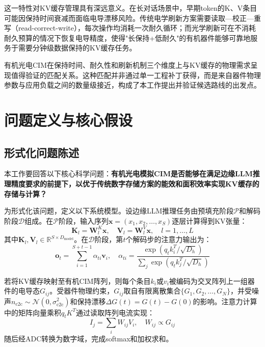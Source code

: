 这一特性对KV缓存管理具有深远意义。在长对话场景中，早期token的K、V条目可能因保持时间衰减而面临电导漂移风险。传统电学刷新方案需要读取—校正—重写（read-correct-write），每次操作均消耗一次耐久循环；而光学刷新可在不消耗耐久预算的情况下恢复电导精度，使得"长保持+低耐久"的有机器件能够可靠地服务于需要分钟级数据保持的KV缓存任务。

有机光电CIM在保持时间、耐久性和刷新机制三个维度上与KV缓存的物理需求呈现值得验证的匹配关系。这种匹配并非通过单一工程补丁获得，而是来自器件物理参数与应用负载之间的数量级接近，构成了本工作提出并验证候选路线的出发点。


\section{问题定义与核心假设}
\label{sec:work2_problem}

\subsection{形式化问题陈述}

本工作要回答以下核心科学问题：\textbf{有机光电模拟CIM是否能够在满足边缘LLM推理精度要求的前提下，以优于传统数字存储方案的能效和面积效率实现KV缓存的存储与计算？}

为形式化该问题，定义以下系统模型。设边缘LLM推理任务由预填充阶段$\mathcal{P}$和解码阶段$\mathcal{D}$组成。在$\mathcal{P}$阶段，输入序列$\mathbf{x} = (x_1, x_2, \dots, x_S)$逐层计算得到KV张量：
\begin{equation}
\mathbf{K}_l = \mathbf{W}_l^K \mathbf{x}, \quad \mathbf{V}_l = \mathbf{W}_l^V \mathbf{x}, \quad l = 1, \dots, L
\label{eq:kv_compute}
\end{equation}
其中$\mathbf{K}_l, \mathbf{V}_l \in \mathbb{R}^{S \times D_{\text{model}}}$。在$\mathcal{D}$阶段，第$t$个解码步的注意力输出为：
\begin{equation}
\mathbf{o}_t = \sum_{i=1}^{S+t-1} \alpha_{ti} \mathbf{v}_i, \quad \alpha_{ti} = \frac{\exp(q_t k_i^T / \sqrt{D_h})}{\sum_j \exp(q_t k_j^T / \sqrt{D_h})}
\label{eq:attention_detail}
\end{equation}

若将KV缓存映射至有机CIM阵列，则每个条目$k_i$或$v_i$被编码为交叉阵列上一组器件的电导态$G_{ij}$。受器件物理约束，$G_{ij}$取自有限离散集合$\{G_1, G_2, \dots, G_N\}$，并受噪声$n_{\text{c2c}} \sim \mathcal{N}(0, \sigma_{\text{c2c}}^2)$和保持漂移$\Delta G(t) = G(t) - G(0)$的影响。注意力计算中的矩阵向量乘积$q_t K^T$通过读取阵列电流实现：
\begin{equation}
I_j = \sum_i W_{ij} V_i, \quad W_{ij} \propto G_{ij}
\label{eq:crossbar_mvm}
\end{equation}
随后经ADC转换为数字域，完成softmax和加权求和。


